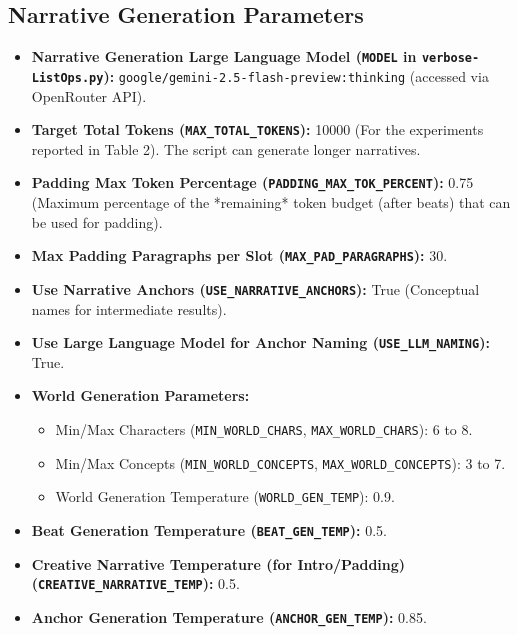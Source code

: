 \documentclass{article}
\begin{document}
\subsection{Narrative Generation Parameters}
\begin{itemize}
  \item \textbf{Narrative Generation Large Language Model (\texttt{MODEL} in \texttt{verbose-ListOps.py}):} \texttt{google/gemini-2.5-flash-preview:thinking} (accessed via OpenRouter API).
  \item \textbf{Target Total Tokens (\texttt{MAX\_TOTAL\_TOKENS}):} \num{10000} (For the experiments reported in Table 2). The script can generate longer narratives.
  \item \textbf{Padding Max Token Percentage (\texttt{PADDING\_MAX\_TOK\_PERCENT}):} 0.75 (Maximum percentage of the *remaining* token budget (after beats) that can be used for padding).
  \item \textbf{Max Padding Paragraphs per Slot (\texttt{MAX\_PAD\_PARAGRAPHS}):} 30.
  \item \textbf{Use Narrative Anchors (\texttt{USE\_NARRATIVE\_ANCHORS}):} True (Conceptual names for intermediate results).
  \item \textbf{Use Large Language Model for Anchor Naming (\texttt{USE\_LLM\_NAMING}):} True.
  \item \textbf{World Generation Parameters:}
        \begin{itemize}
          \item Min/Max Characters (\texttt{MIN\_WORLD\_CHARS}, \texttt{MAX\_WORLD\_CHARS}): 6 to 8.
          \item Min/Max Concepts (\texttt{MIN\_WORLD\_CONCEPTS}, \texttt{MAX\_WORLD\_CONCEPTS}): 3 to 7.
          \item World Generation Temperature (\texttt{WORLD\_GEN\_TEMP}): 0.9.
        \end{itemize}
  \item \textbf{Beat Generation Temperature (\texttt{BEAT\_GEN\_TEMP}):} 0.5.
  \item \textbf{Creative Narrative Temperature (for Intro/Padding) (\texttt{CREATIVE\_NARRATIVE\_TEMP}):} 0.5.
  \item \textbf{Anchor Generation Temperature (\texttt{ANCHOR\_GEN\_TEMP}):} 0.85.
\end{itemize}
\end{document}
